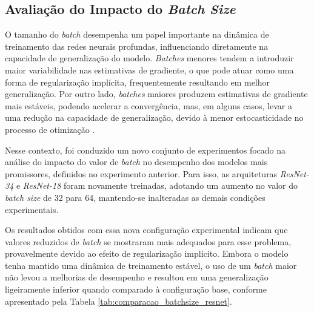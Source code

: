 \subsection{Avaliação do Impacto do \textit{Batch Size}} 

O tamanho do \textit{batch} desempenha um papel importante na dinâmica de treinamento das redes neurais profundas, influenciando diretamente na capacidade de generalização do modelo. \textit{Batches} menores tendem a introduzir maior variabilidade nas estimativas de gradiente, o que pode atuar como uma forma de regularização implícita, frequentemente resultando em melhor generalização. Por outro lado, \textit{batches} maiores produzem estimativas de gradiente mais estáveis, podendo acelerar a convergência, mas, em alguns casos, levar a uma redução na capacidade de generalização, devido à menor estocasticidade no processo de otimização \cite{keskar2016large}.

Nesse contexto,  foi conduzido um novo conjunto de experimentos focado na análise do impacto do valor de \textit{batch} no desempenho dos modelos mais promissores, definidos no experimento anterior. Para isso, as arquiteturas \textit{ResNet-34} e \textit{ResNet-18} foram novamente treinadas, adotando um aumento no valor do \textit{batch size} de 32 para 64, mantendo-se inalteradas as demais condições experimentais.

Os resultados obtidos com essa nova configuração experimental indicam que valores reduzidos de \textit{batch} se mostraram mais adequados para esse problema, provavelmente devido ao efeito de regularização implícito. Embora o modelo tenha mantido uma dinâmica de treinamento estável, o uso de um \textit{batch} maior não levou a melhorias de desempenho e resultou em uma generalização ligeiramente inferior quando comparado à configuração base, conforme apresentado pela Tabela \ref{tab:comparacao_batchsize_resnet}.

